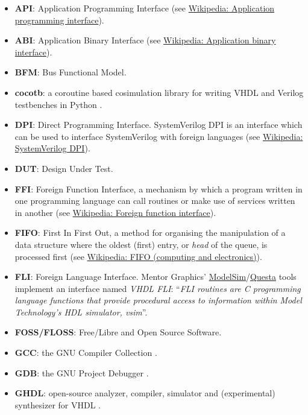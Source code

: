 \documentclass[
]{article}
\begin{document}
\begin{itemize}
\item
  \textbf{API}: Application Programming Interface (see \href{https://en.wikipedia.org/wiki/Application_programming_interface}{Wikipedia: Application programming interface}).
\item
  \textbf{ABI}: Application Binary Interface (see \href{https://en.wikipedia.org/wiki/Application_binary_interface}{Wikipedia: Application binary interface}).
\item
  \textbf{BFM}: Bus Functional Model.
\item
  \textbf{cocotb}: a coroutine based cosimulation library for writing VHDL and Verilog testbenches in Python \autocite{cocotb}.
\item
  \textbf{DPI}: Direct Programming Interface. SystemVerilog DPI is an interface which can be used to interface SystemVerilog with foreign languages (see \href{https://en.wikipedia.org/wiki/SystemVerilog_DPI}{Wikipedia: SystemVerilog DPI}).
\item
  \textbf{DUT}: Design Under Test.
\item
  \textbf{FFI}: Foreign Function Interface, a mechanism by which a program written in one programming language can call routines or make use of services written in another (see \href{https://en.wikipedia.org/wiki/Foreign_function_interface}{Wikipedia: Foreign function interface}).
\item
  \textbf{FIFO}: First In First Out, a method for organising the manipulation of a data structure where the oldest (first) entry, or \emph{head} of the queue, is processed first (see \href{https://en.wikipedia.org/wiki/FIFO_(computing_and_electronics)}{Wikipedia: FIFO (computing and electronics)}).
\item
  \textbf{FLI}: Foreign Language Interface. Mentor Graphics' \href{https://www.mentor.com/products/fv/modelsim/}{ModelSim}/\href{https://www.mentor.com/products/fv/questa/}{Questa} tools implement an interface named \emph{VHDL FLI}: ``\emph{FLI routines are C programming language functions that provide procedural access to information within Model Technology's HDL simulator, vsim}''.
\item
  \textbf{FOSS/FLOSS}: Free/Libre and Open Source Software.
\item
  \textbf{GCC}: the GNU Compiler Collection \autocite{gcc}.
\item
  \textbf{GDB}: the GNU Project Debugger \autocite{gdb}.
\item
  \textbf{GHDL}: open-source analyzer, compiler, simulator and (experimental) synthesizer for VHDL \autocite{ghdl}.

\end{itemize}
\end{document}
